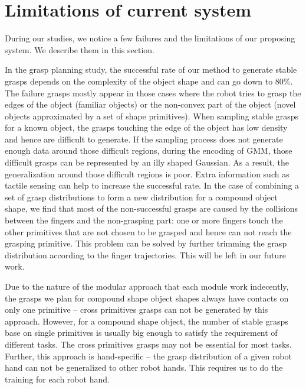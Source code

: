 \section{Limitations of current system}
\label{cha6:limitation}
%
During our studies, we notice a few failures and the limitations of our proposing system. We describe them in this section.

In the grasp planning study, the successful rate of our method to generate stable grasps depends on the complexity of the object shape and can go down to 80$\%$. The failure grasps mostly appear in those cases where the robot tries to grasp the edges of the object (familiar objects) or the non-convex part of the object (novel objects approximated by a set of shape primitives). When sampling stable grasps for a known object, the grasps touching the edge of the object has low density and hence are difficult to generate. If the sampling process does not generate enough data around those difficult regions, during the encoding of GMM, those difficult grasps can be represented by an illy shaped Gaussian. As a result, the generalization around those difficult regions is poor. Extra information such as tactile sensing can help to increase the successful rate.
In the case of combining a set of grasp distributions to form a new distribution for a compound object shape, we find that most of the non-successful grasps are caused by the collisions between the fingers and the non-grasping part: one or more fingers touch the other primitives that are not chosen to be grasped and hence can not reach the grasping primitive. This problem can be solved by further trimming the grasp distribution according to the finger trajectories. This will be left in our future work.

Due to the nature of the modular approach that each module work indecently, the grasps we plan for compound shape object shapes always have contacts on only one primitive -- cross primitives grasps can not be generated by this approach. However, for a compound shape object, the number of stable grasps base on single primitives is usually big enough to satisfy the requirement of different tasks. The cross primitives grasps may not be essential for most tasks.
Further, this approach is hand-specific -- the grasp distribution of a given robot hand can not be generalized to other robot hands. This requires us to do the training for each robot hand.


